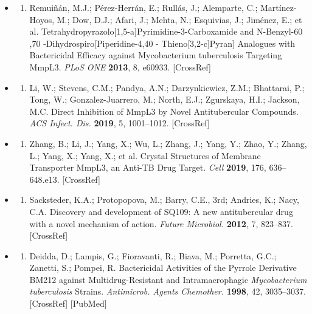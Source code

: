 \documentclass{article}
\begin{document}
\begin{itemize}
\begin{enumerate}
\end{enumerate}

\item \begin{enumerate}
\item 
Remuiñán, M.J.; Pérez-Herrán, E.; Rullás, J.; Alemparte, C.; Martínez-Hoyos, M.; Dow, D.J.; Afari, J.; Mehta, N.; Esquivias, J.; Jiménez, E.; et al. Tetrahydropyrazolo[1,5-a]Pyrimidine-3-Carboxamide and N-Benzyl-60 ,70 -Dihydrospiro[Piperidine-4,40 - Thieno[3,2-c]Pyran] Analogues with Bactericidal Efficacy against Mycobacterium tuberculosis Targeting MmpL3. \textit{PLoS ONE} \textbf{2013}, 8, e60933. [CrossRef]

\end{enumerate}

\item \begin{enumerate}
\item 
Li, W.; Stevens, C.M.; Pandya, A.N.; Darzynkiewicz, Z.M.; Bhattarai, P.; Tong, W.; Gonzalez-Juarrero, M.; North, E.J.; Zgurskaya, H.I.; Jackson, M.C. Direct Inhibition of MmpL3 by Novel Antitubercular Compounds. \textit{ACS Infect. Dis.} \textbf{2019}, 5, 1001–1012. [CrossRef]

\end{enumerate}

\item \begin{enumerate}
\item 
Zhang, B.; Li, J.; Yang, X.; Wu, L.; Zhang, J.; Yang, Y.; Zhao, Y.; Zhang, L.; Yang, X.; Yang, X.; et al. Crystal Structures of Membrane Transporter MmpL3, an Anti-TB Drug Target. \textit{Cell} \textbf{2019}, 176, 636–648.e13. [CrossRef]

\end{enumerate}

\item \begin{enumerate}
\item 
Sacksteder, K.A.; Protopopova, M.; Barry, C.E., 3rd; Andries, K.; Nacy, C.A. Discovery and development of SQ109: A new antitubercular drug with a novel mechanism of action. \textit{Future Microbiol.} \textbf{2012}, 7, 823–837. [CrossRef]

\end{enumerate}

\item \begin{enumerate}
\item 
Deidda, D.; Lampis, G.; Fioravanti, R.; Biava, M.; Porretta, G.C.; Zanetti, S.; Pompei, R. Bactericidal Activities of the Pyrrole Derivative BM212 against Multidrug-Resistant and Intramacrophagic \textit{Mycobacterium tuberculosis} Strains. \textit{Antimicrob. Agents Chemother.} \textbf{1998}, 42, 3035–3037. [CrossRef] [PubMed]


\end{enumerate}
\end{itemize}
\end{document}
